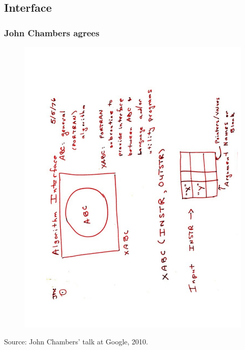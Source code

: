 \documentclass[dvipsnames,compress,pdflatex,beamer]{beamer}
\begin{document}
\subsection{Interface}
\begin{frame}
  \frametitle{John Chambers agrees}

  \begin{figure}
    \includegraphics[scale=0.3,angle=270]{images/Chambers2010_Page6.pdf}
  \end{figure}

  \medskip \footnotesize Source: John Chambers' talk at Google, 2010.
\end{frame}
\end{document}
